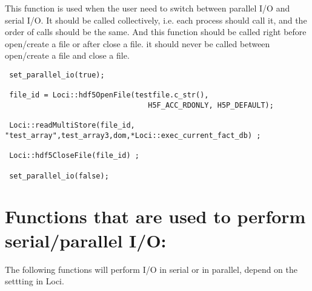 \documentclass{article}
\begin{document}
 This function is used when the user need to switch between parallel I/O and serial I/O.  It should be called collectively, i.e. each process should call it, and the order of calls should be the same.  And this function should be called right before open/create a file or after close a file. it should never be called between open/create a file and close a file.

 \begin{lstlisting}
 set_parallel_io(true);

 file_id = Loci::hdf5OpenFile(testfile.c_str(),
                                 H5F_ACC_RDONLY, H5P_DEFAULT);

 Loci::readMultiStore(file_id, "test_array",test_array3,dom,*Loci::exec_current_fact_db) ;

 Loci::hdf5CloseFile(file_id) ;

 set_parallel_io(false);

 \end{lstlisting}

\section{Functions that are used to perform serial/parallel I/O:}
The following functions will perform I/O in serial or in parallel, depend on the settting in Loci.
  
\end{document}
